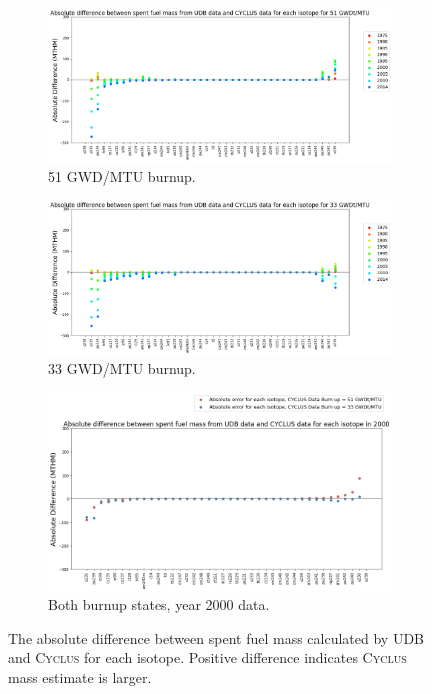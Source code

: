 \documentclass{anstrans}
\newcommand{\Cyclus}{\textsc{Cyclus}\xspace}%
\begin{document}
\begin{figure}[htb] %
	\centering
        \begin{subfigure}{0.9\textwidth}
        \includegraphics[height=0.30\textheight]{figures/absolute_diff_all_51}
        \caption{51 GWD/MTU burnup.}
	\label{fig:absolute_diff_all_51}
        \end{subfigure}
        \begin{subfigure}{0.9\textwidth}
        \includegraphics[height=0.30\textheight]{figures/absolute_diff_all_33}
        \caption{33 GWD/MTU burnup.}
	\label{fig:absolute_diff_all_33}
        \end{subfigure}
        \begin{subfigure}{0.9\textwidth}
        \includegraphics[height=0.35\textheight]{figures/absolute_diff_2000}
        \caption{Both burnup states, year 2000 data.}
	\label{fig:absolute_diff_2000}
        \end{subfigure}
        \caption{The absolute difference between spent fuel mass calculated by 
        UDB and \Cyclus for each isotope. Positive difference indicates \Cyclus 
        mass estimate is larger.}
        \label{fig:absolute}
\end{figure} 
\FloatBarrier
\end{document}
